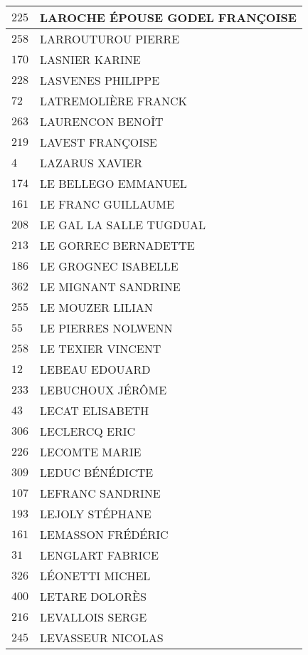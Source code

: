 \begin{xltabular}{\linewidth}{|l|X|}
    \hline
    $225$ & LAROCHE ÉPOUSE GODEL FRANÇOISE \\
    \hline
    $258$ & LARROUTUROU PIERRE \\
    \hline
    $170$ & LASNIER KARINE \\
    \hline
    $228$ & LASVENES PHILIPPE \\
    \hline
    $72$ & LATREMOLIÈRE FRANCK \\
    \hline
    $263$ & LAURENCON BENOÎT \\
    \hline
    $219$ & LAVEST FRANÇOISE \\
    \hline
    $4$ & LAZARUS XAVIER \\
    \hline
    $174$ & LE BELLEGO EMMANUEL \\
    \hline
    $161$ & LE FRANC GUILLAUME \\
    \hline
    $208$ & LE GAL LA SALLE TUGDUAL \\
    \hline
    $213$ & LE GORREC BERNADETTE \\
    \hline
    $186$ & LE GROGNEC ISABELLE \\
    \hline
    $362$ & LE MIGNANT SANDRINE \\
    \hline
    $255$ & LE MOUZER LILIAN \\
    \hline
    $55$ & LE PIERRES NOLWENN \\
    \hline
    $258$ & LE TEXIER VINCENT \\
    \hline
    $12$ & LEBEAU EDOUARD \\
    \hline
    $233$ & LEBUCHOUX JÉRÔME \\
    \hline
    $43$ & LECAT ELISABETH \\
    \hline
    $306$ & LECLERCQ ERIC \\
    \hline
    $226$ & LECOMTE MARIE \\
    \hline
    $309$ & LEDUC BÉNÉDICTE \\
    \hline
    $107$ & LEFRANC SANDRINE \\
    \hline
    $193$ & LEJOLY STÉPHANE \\
    \hline
    $161$ & LEMASSON FRÉDÉRIC \\
    \hline
    $31$ & LENGLART FABRICE \\
    \hline
    $326$ & LÉONETTI MICHEL \\
    \hline
    $400$ & LETARE DOLORÈS \\
    \hline
    $216$ & LEVALLOIS SERGE \\
    \hline
    $245$ & LEVASSEUR NICOLAS \\
    \hline

\end{xltabular}
